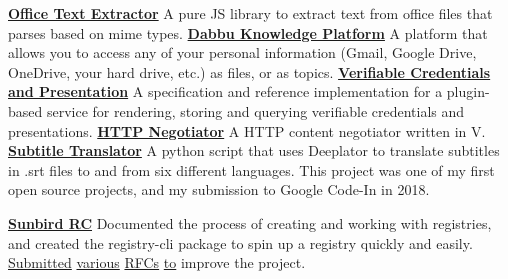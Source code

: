 \documentclass{resume}
\begin{document}
\begin{multicols}{2}
    \begin{adjustwidth}{1em}{0em}
    \textbf{\href{https://github.com/gamemaker1/office-text-extractor}{Office Text Extractor}}
    \newline A pure JS library to extract text from office files that parses based on mime types.
    \newline \newline
    \textbf{\href{https://dabbu-knowledge-platform.github.io}{Dabbu Knowledge Platform}}
    \newline A platform that allows you to access any of your personal information (Gmail, Google Drive, OneDrive, your hard drive, etc.) as files, or as topics.
    \newline \newline
    \textbf{\href{https://github.com/verifiable-presentation/impl}{Verifiable Credentials and Presentation}}
    \newline A specification and reference implementation for a plugin-based service for rendering, storing and querying verifiable credentials and presentations.
    \newline \newline
    \textbf{\href{https://github.com/gamemaker1/http-negotiator}{HTTP Negotiator}}
    \newline A HTTP content negotiator written in V.
    \newline \newline
    \textbf{\href{https://github.com/gamemaker1/subtitle-translator}{Subtitle Translator}}
    \newline A python script that uses Deeplator to translate subtitles in .srt files to and from six different languages. This project was one of my first open source projects, and my submission to Google Code-In in 2018.
    \newline \newline
    \end{adjustwidth}
    \columnbreak
    \begin{adjustwidth}{1em}{0em}
    \href{https://github.com/search?q=involves%3Agamemaker1+org%3Asunbird-rc&type=pullrequests}{\textbf{Sunbird RC}}
    \newline Documented the process of creating and working with registries, and created the registry-cli package to spin up a registry quickly and easily. \href{https://github.com/gamemaker1/electronic-registry-spec}{Submitted} \href{https://github.com/orgs/Sunbird-RC/discussions/98}{various} \href{https://github.com/orgs/Sunbird-RC/discussions/99}{RFCs} \href{https://github.com/orgs/Sunbird-RC/discussions/103}{to} improve the project.

\end{adjustwidth}
\end{multicols}
\end{document}
